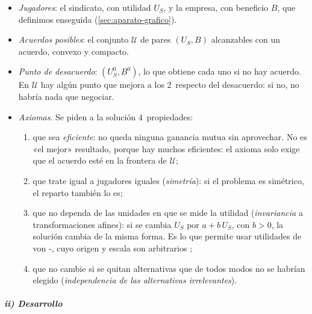 \documentclass[11pt]{article}
\begin{document}
\begin{itemize}
\item \emph{Jugadores}: el sindicato, con utilidad $U_S$, y la empresa, con beneficio $B$, que definimos enseguida (\ref{sec:aparato-grafico}).
\item \emph{Acuerdos posibles}: el conjunto $\mathcal{U}$ de pares $(U_S,B)$ alcanzables con un acuerdo, convexo y compacto.
\item \emph{Punto de desacuerdo}: $(U_S^0,B^0)$, lo que obtiene cada uno si no hay acuerdo. En $\mathcal{U}$ hay algún punto que mejora a los 2~respecto del desacuerdo: si no, no habría nada que negociar.
\item \emph{Axiomas}. Se piden a la solución 4~propiedades:
  \begin{enumerate}
  \item que sea \emph{eficiente}: no queda ninguna ganancia mutua sin aprovechar. No es «el mejor» resultado, porque hay muchos eficientes: el axioma solo exige que el acuerdo esté en la frontera de $\mathcal{U}$;
  \item que trate igual a jugadores iguales (\emph{simetría}): si el problema es simétrico, el reparto también lo es;
  \item que no dependa de las unidades en que se mide la utilidad (\emph{invariancia} a transformaciones afines): si se cambia $U_S$ por $a+b\,U_S$, con $b>0$, la solución cambia de la misma forma. Es lo que permite usar utilidades de von -, cuyo origen y escala son arbitrarios ;
  \item que no cambie si se quitan alternativas que de todos modos no se habrían elegido (\emph{independencia de las alternativas irrelevantes}).
  \end{enumerate}
\end{itemize}

\subparagraph{ii) Desarrollo}
\end{document}
